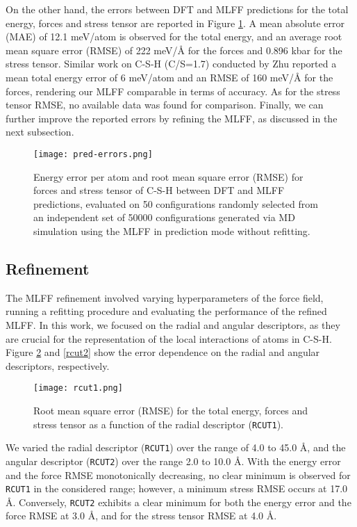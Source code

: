 On the other hand, the errors between DFT and MLFF predictions for the total energy, forces and stress tensor are reported in Figure \ref{pred-errors}. A mean absolute error (MAE) of 12.1 meV/atom is observed for the total energy, and an average root mean square error (RMSE) of 222 meV/Å for the forces and 0.896 kbar for the stress tensor. Similar work on C-S-H (C/S=1.7) conducted by Zhu \supercite{Zhu2024} reported a mean total energy error of 6 meV/atom and an RMSE of 160 meV/Å for the forces, rendering our MLFF comparable in terms of accuracy. As for the stress tensor RMSE, no available data was found for comparison. Finally, we can further improve the reported errors by refining the MLFF, as discussed in the next subsection.

\begin{figure}[h]
    \centering
    \texttt{[image: pred-errors.png]}
    \caption{
    Energy error per atom and root mean square error (RMSE) for forces and stress tensor of C-S-H between DFT and MLFF predictions, evaluated on 50 configurations randomly selected from an independent set of 50000 configurations generated via MD simulation using the MLFF in prediction mode without refitting. 
    }
    \label{pred-errors}
\end{figure}

\subsection{Refinement}
The MLFF refinement involved varying hyperparameters of the force field, running a refitting procedure and evaluating the performance of the refined MLFF. In this work, we focused on the radial and angular descriptors, as they are crucial for the representation of the local interactions of atoms in C-S-H. Figure \ref{rcut1} and \ref{rcut2} show the error dependence on the radial and angular descriptors, respectively. 

\begin{figure}[h]
    \centering
    \texttt{[image: rcut1.png]}
    \caption{
    Root mean square error (RMSE) for the total energy, forces and stress tensor as a function of the radial descriptor (\texttt{RCUT1}). 
    }
    \label{rcut1}
\end{figure}
We varied the radial descriptor (\texttt{RCUT1}) over the range of 4.0 to 45.0 Å, and the angular descriptor (\texttt{RCUT2}) over the range 2.0 to 10.0 Å. With the energy error and the force RMSE monotonically decreasing, no clear minimum is observed for \texttt{RCUT1} in the considered range; however, a minimum stress RMSE occurs at 17.0 \AA. Conversely, \texttt{RCUT2} exhibits a clear minimum for both the energy error and the force RMSE at 3.0 \AA, and for the stress tensor RMSE at 4.0 \AA.

